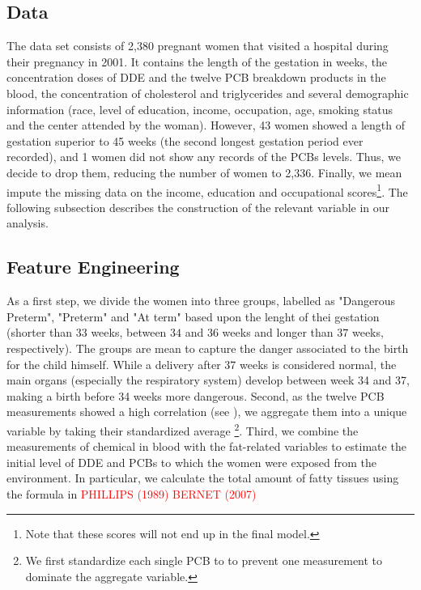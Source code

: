 \documentclass[wcp]{jmlr}%
\begin{document}
\subsection{Data}
\label{sec:data}
The data set consists of 2,380 pregnant women that visited a hospital during their pregnancy in 2001. It contains the length of the gestation in weeks, the concentration doses of DDE and the twelve PCB breakdown products in the blood, the concentration of cholesterol and triglycerides and several demographic information (race, level of education, income, occupation, age, smoking status and the center attended by the woman). However, 43 women showed a length of gestation superior to 45 weeks (the second longest gestation period ever recorded), and 1 women did not show any records of the PCBs levels. Thus, we decide to drop them, reducing the number of women to 2,336. Finally, we mean impute the missing data on the income, education and occupational scores\footnote{Note that these scores will not end up in the final model.}. The following subsection describes the construction of the relevant variable in our analysis.

\subsection{Feature Engineering}
As a first step, we divide the women into three groups, labelled as "Dangerous Preterm", "Preterm" and "At term" based upon the lenght of thei gestation (shorter than $33$ weeks, between $34$ and $36$ weeks and longer than $37$ weeks, respectively). The groups are mean to capture the danger associated to the birth for the child himself. While a delivery after 37 weeks is considered normal, the main organs (especially the respiratory system) develop between week 34 and 37, making a birth before 34 weeks more dangerous. Second, as the twelve PCB measurements showed a high correlation (see ), we aggregate them into a unique variable by taking their standardized average \footnote{We first standardize each single PCB to to prevent one measurement to dominate the aggregate variable.}. Third, we combine the measurements of chemical in blood with the fat-related variables to estimate the initial level of DDE and PCBs to which the women were exposed from the environment. In particular, we calculate the total amount of fatty tissues using the formula in \textcolor{red}{PHILLIPS (1989) BERNET (2007)}
\end{document}

